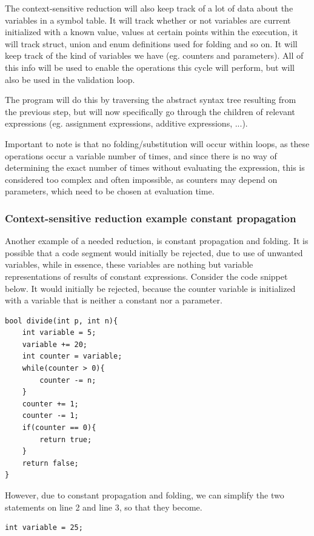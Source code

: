 \documentclass[12pt]{article}
\begin{document}
The context-sensitive reduction will also keep track of a lot of data about the variables in a symbol table. It will track whether or not variables are current initialized with a known value, values at certain points within the execution, it will track struct, union and enum definitions used for folding and so on. It will keep track of the kind of variables we have (eg. counters and parameters). All of this info will be used to enable the operations this cycle will perform, but will also be used in the validation loop.

The program will do this by traversing the abstract syntax tree resulting from the previous step, but will now specifically go through the children of relevant expressions (eg. assignment expressions, additive expressions, ...).

Important to note is that no folding/substitution will occur within loops, as these operations occur a variable number of times, and since there is no way of determining the exact number of times without evaluating the expression, this is considered too complex and often impossible, as counters may depend on parameters, which need to be chosen at evaluation time.


\subsubsection{Context-sensitive reduction example constant propagation}
Another example of a needed reduction, is constant propagation and folding. It is possible that a code segment would initially be rejected, due to use of unwanted variables, while in essence, these variables are nothing but variable representations of results of constant expressions. Consider the code snippet below. It would initially be rejected, because the counter variable is initialized with a variable that is neither a constant nor a parameter.
\newpage
\begin{lstlisting}[style=CStyle]
bool divide(int p, int n){
	int variable = 5;
	variable += 20;
	int counter = variable;
	while(counter > 0){
		counter -= n;
	}
	counter += 1;
	counter -= 1;
	if(counter == 0){
		return true;
	}
	return false;
}
\end{lstlisting}

However, due to constant propagation and folding, we can simplify the two statements on line 2 and line 3, so that they become.

\begin{lstlisting}[style=CStyle]
int variable = 25;
\end{lstlisting}
\end{document}
